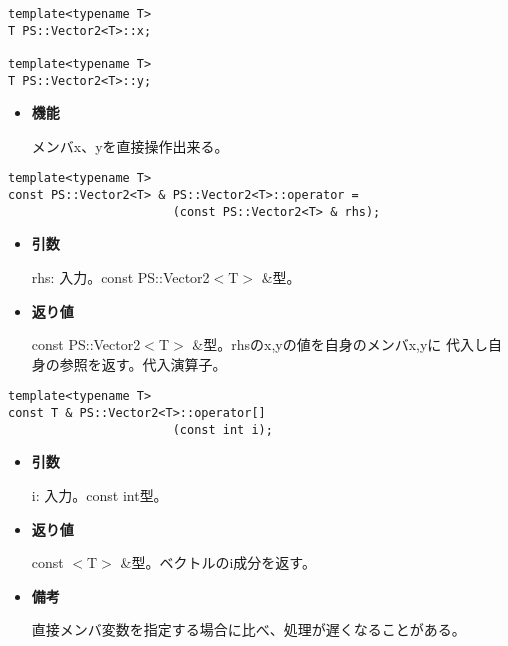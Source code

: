 
\begin{screen}
\begin{verbatim}
template<typename T>
T PS::Vector2<T>::x;

template<typename T>
T PS::Vector2<T>::y;
\end{verbatim}
\end{screen}

\begin{itemize}
  
\item{{\bf 機能}}
  
  メンバ{x}、{y}を直接操作出来る。
  
\end{itemize}


\begin{screen}
\begin{verbatim}
template<typename T>
const PS::Vector2<T> & PS::Vector2<T>::operator = 
                       (const PS::Vector2<T> & rhs);
\end{verbatim}
\end{screen}

\begin{itemize}

\item{{\bf 引数}}

{rhs}: 入力。{const PS::Vector2$<$T$>$ \&}型。

\item{{\bf 返り値}}

{const PS::Vector2$<$T$>$ \&}型。{rhs}のx,yの値を自身のメンバx,yに
代入し自身の参照を返す。代入演算子。

\end{itemize}


\begin{screen}
\begin{verbatim}
template<typename T>
const T & PS::Vector2<T>::operator[]
                       (const int i);
\end{verbatim}
\end{screen}

\begin{itemize}

\item{{\bf 引数}}

  {i}: 入力。{const int}型。

\item{{\bf 返り値}}

  {const $<$T$>$ \&}型。ベクトルのi成分を返す。
  
\item{{\bf 備考}}

  直接メンバ変数を指定する場合に比べ、処理が遅くなることがある。

\end{itemize}

